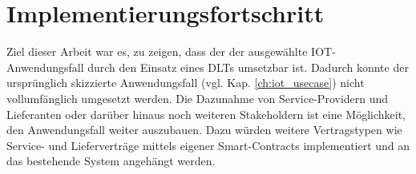 \section{Implementierungsfortschritt}
\label{sec:results:progress}
Ziel dieser Arbeit war es, zu zeigen, dass der der ausgewählte \ac{IOT}-Anwendungsfall durch den Einsatz eines \ac{DLT}s umsetzbar ist. Dadurch konnte der ursprünglich skizzierte Anwendungsfall (vgl. Kap. \ref{ch:iot_usecase}) nicht vollumfänglich umgesetzt werden. Die Dazunahme von Service-Providern und Lieferanten oder darüber hinaus noch weiteren Stakeholdern ist eine Möglichkeit, den Anwendungsfall weiter auszubauen. Dazu würden weitere Vertragstypen wie Service- und Lieferverträge mittels eigener Smart-Contracts implementiert und an das bestehende System angehängt werden.
